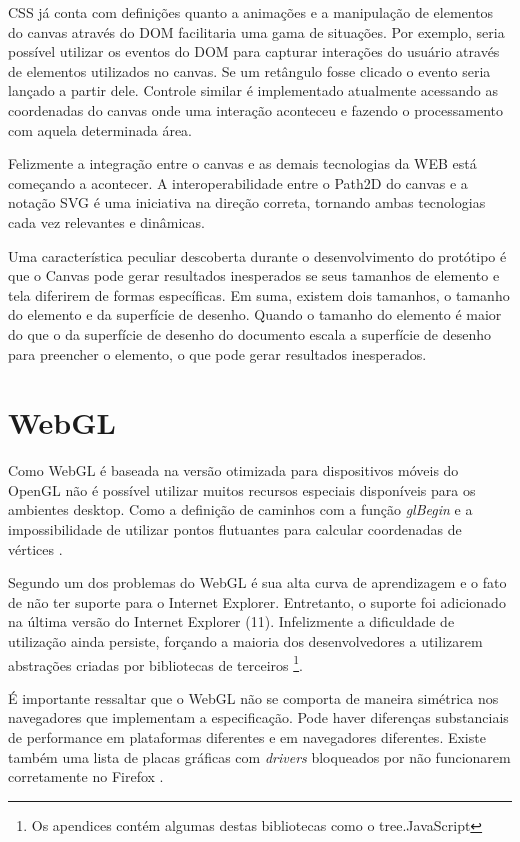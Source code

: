 CSS já conta com definições quanto a animações e a manipulação de
elementos do canvas através do DOM facilitaria uma gama de situações.
Por exemplo, seria possível utilizar os eventos do DOM para capturar
interações do usuário através de elementos utilizados no canvas.
Se um retângulo fosse clicado o evento seria lançado a partir dele.
Controle similar é implementado atualmente acessando as coordenadas
do canvas onde uma interação aconteceu e fazendo o processamento com
aquela determinada área.

Felizmente a integração entre o canvas e as demais tecnologias da
WEB está começando a acontecer. A interoperabilidade entre o Path2D
do canvas e a notação SVG é uma iniciativa na direção correta,
tornando ambas tecnologias cada vez relevantes e dinâmicas.

Uma característica peculiar descoberta durante o desenvolvimento
do protótipo é que o Canvas pode gerar resultados inesperados se
seus tamanhos de elemento e tela diferirem de formas específicas. Em
suma, existem dois tamanhos, o tamanho do elemento e da superfície de
desenho. Quando o tamanho do elemento é maior do que o da superfície
de desenho do documento escala a superfície de desenho para preencher o
elemento, o que pode gerar resultados inesperados.

\section{WebGL}

Como WebGL é baseada na versão otimizada para dispositivos móveis do
OpenGL não é possível utilizar muitos recursos especiais disponíveis
para os ambientes desktop. Como a definição de caminhos com a função
\textit{glBegin} e a impossibilidade de utilizar pontos flutuantes para
calcular coordenadas de vértices \autocite{esVsGl}.

Segundo \cite{html5mostwanted} um dos problemas do WebGL é sua alta
curva de aprendizagem e o fato de não ter suporte para o Internet
Explorer. Entretanto, o suporte foi adicionado na última versão do
Internet Explorer (11). Infelizmente a dificuldade de utilização
ainda persiste, forçando a maioria dos desenvolvedores a utilizarem
abstrações criadas por bibliotecas de terceiros \footnote{Os apendices
contém algumas destas bibliotecas como o tree.JavaScript}.

É importante ressaltar que o WebGL não se comporta de maneira
simétrica nos navegadores que implementam a especificação. Pode haver
diferenças substanciais de performance em plataformas diferentes e em
navegadores diferentes. Existe também uma lista de placas gráficas com
\textit{drivers} bloqueados por não funcionarem corretamente no Firefox
\autocite[pp.42]{3daps}.

